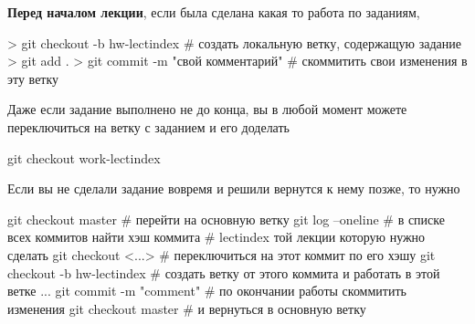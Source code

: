 {\bf Перед началом лекции}, если была сделана какая то работа по заданиям,
\begin{shelloutput}
> git checkout -b hw-lect{index}      # создать локальную ветку, содержащую задание
> git add .
> git commit -m "{свой комментарий}"  # скоммитить свои изменения в эту ветку
\end{shelloutput}

Даже если задание выполнено не до конца, вы в любой момент можете переключиться на ветку с заданием и его доделать
\begin{shelloutput}
git checkout work-lect{index}
\end{shelloutput}

Если вы не сделали задание вовремя и решили вернутся к нему позже, то нужно
\begin{shelloutput}
git checkout master            # перейти на основную ветку
git log --oneline              # в списке всех коммитов найти хэш коммита
                               # lect{index} той лекции которую нужно сделать
git checkout <...>             # переключиться на этот коммит по его хэшу
git checkout -b hw-lect{index} # создать ветку от этого коммита и работать в этой ветке
...
git commit -m "comment"        # по окончании работы скоммитить изменения
git checkout master            # и вернуться в основную ветку
\end{shelloutput}

